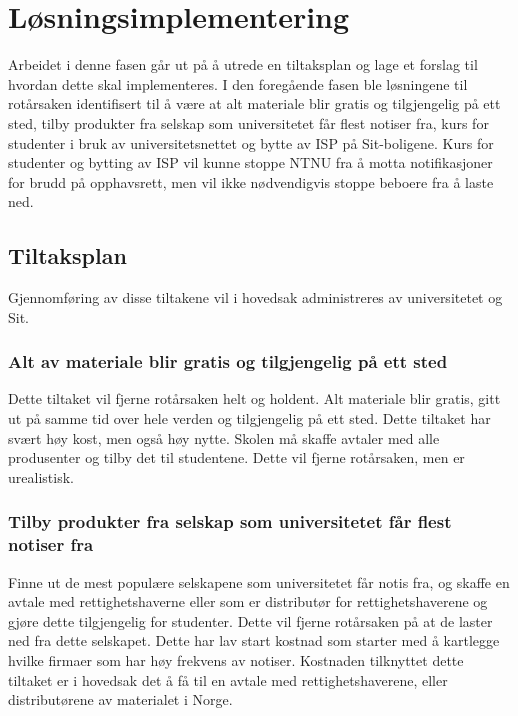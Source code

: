 \chapter{Løsningsimplementering}
Arbeidet i denne fasen går ut på å utrede en tiltaksplan og lage et forslag til hvordan dette skal implementeres. I den foregående fasen ble løsningene til rotårsaken identifisert til å være at alt materiale blir gratis og tilgjengelig på ett sted, tilby produkter fra selskap som universitetet får flest notiser fra, kurs for studenter i bruk av universitetsnettet og bytte av ISP på Sit-boligene. Kurs for studenter og bytting av ISP vil kunne stoppe NTNU fra å motta notifikasjoner for brudd på opphavsrett, men vil ikke nødvendigvis stoppe beboere fra å laste ned. 

\section{Tiltaksplan}
Gjennomføring av disse tiltakene vil i hovedsak administreres av universitetet og Sit.

\subsection{Alt av materiale blir gratis og tilgjengelig på ett sted}
Dette tiltaket vil fjerne rotårsaken helt og holdent. Alt materiale blir gratis, gitt ut på samme tid over hele verden og tilgjengelig på ett sted. Dette tiltaket har svært høy kost, men også høy nytte. Skolen må skaffe avtaler med alle produsenter og tilby det til studentene. Dette vil fjerne rotårsaken, men er urealistisk. 

\subsection{Tilby produkter fra selskap som universitetet får flest notiser fra}
Finne ut de mest populære selskapene som universitetet får notis fra, og skaffe en avtale med rettighetshaverne eller som er distributør for rettighetshaverene og gjøre dette tilgjengelig for studenter. Dette vil fjerne rotårsaken på at de laster ned fra dette selskapet. Dette har lav start kostnad som starter med å kartlegge hvilke firmaer som har høy frekvens av notiser. Kostnaden tilknyttet dette tiltaket er i hovedsak det å få til en avtale med rettighetshaverene, eller distributørene av materialet i Norge.

